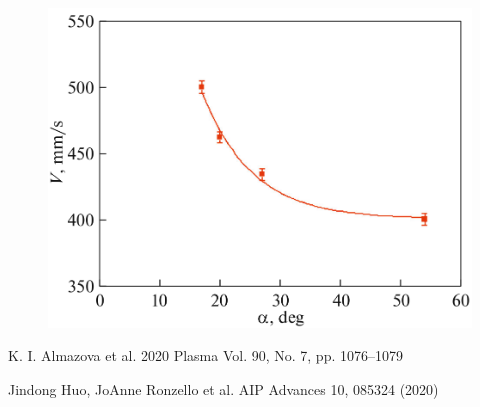 \begin{minipage}[b]{0.45\linewidth}
	\begin{figure}[htbp]
	\centering
	\includegraphics[width=1\textwidth]{images/almazova_vel.png}
	\caption*{}
	\label{alm_data}
	\end{figure}
\end{minipage}
\hfill
\begin{minipage}[b]{0.45\linewidth}

\end{minipage}

\footnotesize{
\begin{thebibliography}{99}
      K. I. Almazova et al. 2020 Plasma Vol. 90, No. 7, pp. 1076–1079
\end{thebibliography}

\begin{thebibliography}{99}
      Jindong Huo, JoAnne Ronzello et al. AIP Advances 10, 085324 (2020)
\end{thebibliography}
}